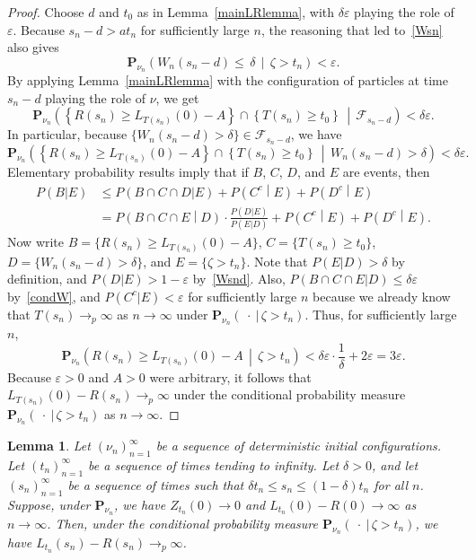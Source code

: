 \documentclass[10pt]{amsart}
\newtheorem{lemm}[theo]{Lemma}\newtheorem{prop}[theo]{Proposition}\newtheorem{coro}[theo]{Corollary}\newtheorem{conj}[theo]{Conjecture}
\theoremstyle{definition}\newtheorem{defi}[theo]{Definition}\newtheorem{rema}[theo]{Remark}\newtheorem{exam}[theo]{Example}\newtheorem{exem}[theo]{Example}\newtheorem{nota}[theo]{Notation}
\newcommand*\eps{\varepsilon}
\renewcommand*\P{\mathbf{P}}
\newcommand\F{\mathcal{F}}
\newcommand{\1} {\mathds{1}}
\begin{document}
\begin{proof}
Choose $d$ and $t_0$ as in Lemma~\ref{mainLRlemma}, with $\delta \eps$ playing the role of $\eps$. Because $s_n - d > at_n$ for sufficiently large $n$, the reasoning that led to~\eqref{Wsn} also gives
\begin{equation}\label{Wsnd}
\P_{\nu_n} \left(W_n(s_n - d) \leq \,\delta \,\middle|\, \zeta > t_n\right) < \eps.
\end{equation}
By applying Lemma~\ref{mainLRlemma} with the configuration of particles at time $s_n - d$ playing the role of $\nu$, we get
\[
\P_{\nu_n}\left(\left\{R(s_n) \geq L_{T(s_n)}(0) - A\right\} \cap \left\{T(s_n) \geq t_0\right\}\,\middle|\,\F_{s_n - d}\right) < \delta \eps.
\]
In particular, because $\{W_n(s_n - d) > \delta\} \in \F_{s_n - d}$, we have
\begin{equation}\label{condW}
\P_{\nu_n}\left(\left\{R(s_n) \geq L_{T(s_n)}(0) - A\right\} \cap \left\{T(s_n) \geq t_0\right\}\,\middle|\,W_n(s_n - d) > \delta\right) < \delta \eps.
\end{equation}
Elementary probability results imply that if $B$, $C$, $D$, and $E$ are events, then
\begin{align*}
P(B|E) &\leq P(B \cap C \cap D|E) + P\left(C^c\middle|E\right) + P\left(D^c\middle|E\right) \\
&= P\left(B \cap C \cap E\middle|D\right) \cdot \frac{P(D|E)}{P(E|D)} + P\left(C^c\middle|E\right) + P\left(D^c\middle|E\right).
\end{align*}
Now write $B = \{R(s_n) \geq L_{T(s_n)}(0) - A\}$, $C = \{T(s_n) \geq t_0\}$, $D = \{W_n(s_n - d) > \delta\}$, and $E = \{\zeta > t_n\}$. Note that $P(E|D) > \delta$ by definition, and $P(D|E) > 1 - \eps$ by~\eqref{Wsnd}. Also, $P(B \cap C \cap E|D) \leq \delta \eps$ by~\eqref{condW}, and $P(C^c|E) < \eps$ for sufficiently large $n$ because we already know that $T(s_n) \rightarrow_p \infty$ as $n \rightarrow \infty$ under $\P_{\nu_n}(\: \cdot \: |\, \zeta > t_n)$. Thus, for sufficiently large $n$,
\[
\P_{\nu_n}\left(R(s_n) \geq L_{T(s_n)}(0) - A\,\middle|\, \zeta > t_n\right) < \delta \eps \cdot \frac{1}{\delta} + 2 \eps = 3 \eps.
\]
Because $\eps > 0$ and $A > 0$ were arbitrary, it follows that $L_{T(s_n)}(0) - R(s_n) \rightarrow_p \infty$ under the conditional probability measure $\P_{\nu_n}(\: \cdot \:|\,\zeta > t_n)$ as $n \rightarrow \infty$.
\end{proof}

\begin{lemm}\label{Ttcompare}
Let $(\nu_n)_{n=1}^{\infty}$ be a sequence of deterministic initial configurations. Let $(t_n)_{n=1}^{\infty}$ be a sequence of times tending to infinity. Let $\delta > 0$, and let $(s_n)_{n=1}^{\infty}$ be a sequence of times such that $\delta t_n \leq s_n \leq (1 - \delta) t_n$ for all $n$. Suppose, under $\P_{\nu_n}$, we have $Z_{t_n}(0) \rightarrow 0$ and $L_{t_n}(0) - R(0) \rightarrow \infty$ as $n \rightarrow \infty$. Then, under the conditional probability measure $\P_{\nu_n}(\: \cdot \:|\,\zeta > t_n)$, we have $L_{t_n}(s_n) - R(s_n) \rightarrow_p \infty$.
\end{lemm}
\end{document}
